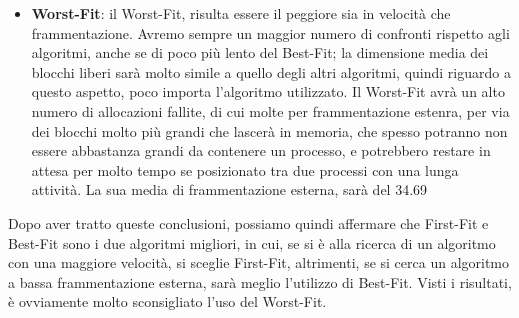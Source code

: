 \documentclass[20pt,a4paper,oneside]{article}
\begin{document}
\begin{itemize}
\item \textbf{Worst-Fit}: il Worst-Fit, risulta essere il peggiore sia in velocità che frammentazione. Avremo sempre un maggior numero di confronti rispetto agli algoritmi, anche se di poco più lento del Best-Fit; la dimensione media dei blocchi liberi sarà molto simile a quello degli altri algoritmi, quindi riguardo a questo aspetto, poco importa l'algoritmo utilizzato. Il Worst-Fit avrà un alto numero di allocazioni fallite, di cui molte per frammentazione estenra, per via dei blocchi molto più grandi che lascerà in memoria, che spesso potranno non essere abbastanza grandi da contenere un processo, e potrebbero restare in attesa per molto tempo se posizionato tra due processi con una lunga attività. La sua media di frammentazione esterna, sarà del 34.69%
\end{itemize}

Dopo aver tratto queste conclusioni, possiamo quindi affermare che First-Fit e Best-Fit sono i due algoritmi migliori, in cui, se si è alla ricerca di un algoritmo con una maggiore velocità, si sceglie First-Fit, altrimenti, se si cerca un algoritmo a bassa frammentazione esterna, sarà meglio l'utilizzo di Best-Fit. Visti i risultati, è ovviamente molto sconsigliato l'uso del Worst-Fit.
\end{document}
